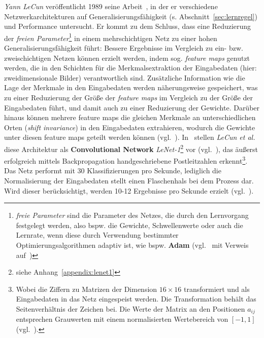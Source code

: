 \textit{Yann LeCun} veröffentlicht 1989 seine Arbeit~\cite{Cun89}, in der er verschiedene Netzwerkarchitekturen auf Generalisierungsfähigkeit (s. Abschnitt~\ref{sec:lernregel}) und Performance untersucht. Er kommt zu dem Schluss, dass eine Reduzierung der \textit{freien Parameter}\footnote{
    \textit{freie Parameter} sind die Parameter des Netzes, die durch den Lernvorgang festgelegt werden, also bspw. die Gewichte, Schwellenwerte oder auch die Lernrate, wenn diese durch Verwendung bestimmter Optimierungsalgorithmen adaptiv ist, wie bspw. \textbf{Adam} (vgl.~\cite[346]{GBC18} mit Verweis auf~\cite{KB17})
} in einem mehrschichtigen Netz zu einer hohen Generalisierungsfähigkeit führt: Bessere Ergebnisse im Vergleich zu  ein- bzw. zweischichtigen Netzen können erzielt werden, indem sog. \textit{feature maps} genutzt werden, die in den Schichten für die Merkmalsextraktion der Eingabedaten (hier: zweidimensionale Bilder) verantwortlich sind.
Zusätzliche Information wie die Lage der Merkmale in den Eingabedaten werden näherungsweise gespeichert, was zu einer Reduzierung der Größe der \textit{feature maps} im Vergleich zu der Größe der Eingabedaten führt, und damit auch zu einer Reduzierung der Gewichte.
Darüber hinaus können mehrere feature maps die gleichen Merkmale an unterschiedlichen Orten (\textit{shift invariance}) in den Eingabedaten extrahieren, wodurch die Gewichte unter diesen feature maps geteilt werden können (vgl.~\cite[151 f.]{Cun89}).
In~\cite{CBD+89} stellen \textit{LeCun et al.} diese Architektur als \textbf{Convolutional Network} \textit{LeNet-1}\footnote{
    siehe Anhang~\ref{appendix:lenet1}
}  vor (vgl.~\cite[13]{CBBH98}), das äußerst erfolgreich mittels Backpropagation handgeschriebene Postleitzahlen erkennt\footnote{
    Wobei die Ziffern zu Matrizen der Dimension $16 \times 16$ transformiert und als Eingabedaten in das Netz eingespeist werden. Die Transformation behält das Seitenverhältnis der Zeichen bei. Die Werte der Matrix an den Positionen $a_{ij}$ entsprechen Grauwerten mit einem normalisierten Wertebereich von $[-1, 1]$ (vgl.~\cite[542]{CBD+89}).
}. Das Netz performt mit 30 Klassifizierungen pro Sekunde, lediglich die Normalisierung der Eingabedaten stellt einen Flaschenhals bei dem Prozess dar. Wird dieser berücksichtigt, werden 10-12 Ergebnisse pro Sekunde erzielt (vgl.~\cite[549]{CBD+89}).\\



